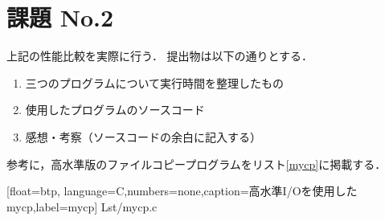 \section*{課題 No.2 }
上記の性能比較を実際に行う．
提出物は以下の通りとする．

\begin{enumerate}
\item 三つのプログラムについて実行時間を整理したもの
\item 使用したプログラムのソースコード
\item 感想・考察（ソースコードの余白に記入する）
\end{enumerate}

参考に，高水準版のファイルコピープログラムをリスト\ref{mycp}に掲載する．

\newpage


    [float=btp,
      language=C,numbers=none,caption=高水準I/Oを使用したmycp,label=mycp]
    {Lst/mycp.c}

